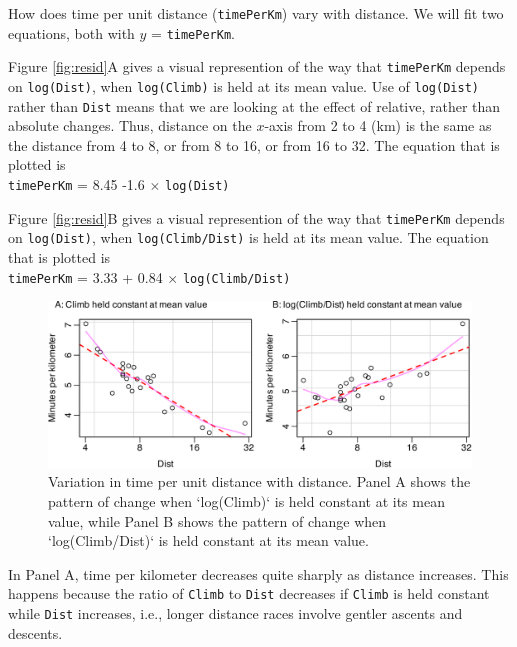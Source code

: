 \documentclass[
  10pt,
  b5paper]{book}
\begin{document}
How does time per unit distance (\texttt{timePerKm}) vary with distance.
We will fit two equations, both with \(y\) = \texttt{timePerKm}.

Figure \ref{fig:resid}A gives a visual represention of the
way that \texttt{timePerKm} depends on \texttt{log(Dist)}, when \texttt{log(Climb)}
is held at its mean value. Use of \texttt{log(Dist)} rather than
\texttt{Dist} means that we are looking at the effect of relative,
rather than absolute changes. Thus, distance on the \(x\)-axis
from 2 to 4 (km) is the same as the distance from 4 to 8, or
from 8 to 16, or from 16 to 32. The equation that is plotted
is\\
\texttt{timePerKm} = 8.45 -1.6 \(\times\) \texttt{log(Dist)}

Figure \ref{fig:resid}B gives a visual represention of the
way that \texttt{timePerKm} depends on \texttt{log(Dist)}, when \texttt{log(Climb/Dist)}
is held at its mean value. The equation that is plotted
is\\
\texttt{timePerKm} = 3.33 + 0.84 \(\times\) \texttt{log(Climb/Dist)}

\begin{figure}[H]

{\centering \includegraphics[width=1\linewidth]{08-observational_files/figure-latex/partial-1} 

}

\caption{Variation in time per unit distance with distance.  Panel A
shows the pattern of change when `log(Climb)` is held constant at its 
mean value, while Panel B shows the pattern of change when 
`log(Climb/Dist)` is held constant at its mean value.}\label{fig:partial}
\end{figure}

In Panel A, time per kilometer decreases quite sharply as distance
increases. This happens because the ratio of \texttt{Climb} to \texttt{Dist}
decreases if \texttt{Climb} is held constant while \texttt{Dist} increases,
i.e., longer distance races involve gentler ascents and descents.
\end{document}

